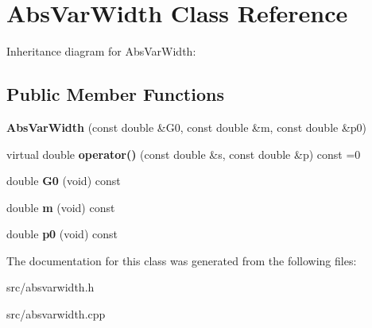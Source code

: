 \hypertarget{class_abs_var_width}{}\section{Abs\+Var\+Width Class Reference}
\label{class_abs_var_width}


Inheritance diagram for Abs\+Var\+Width\+:
\subsection*{Public Member Functions}
\begin{DoxyCompactItemize}
\item 
\hypertarget{class_abs_var_width_ae49f00a70fe7362946f3941645f00294}{}{\bfseries Abs\+Var\+Width} (const double \&G0, const double \&m, const double \&p0)\label{class_abs_var_width_ae49f00a70fe7362946f3941645f00294}

\item 
\hypertarget{class_abs_var_width_a92ac8aacb759b534f5900a0acdc3c0d0}{}virtual double {\bfseries operator()} (const double \&s, const double \&p) const =0\label{class_abs_var_width_a92ac8aacb759b534f5900a0acdc3c0d0}

\item 
\hypertarget{class_abs_var_width_a22569299c6d3b374c89e6eba0ceee320}{}double {\bfseries G0} (void) const \label{class_abs_var_width_a22569299c6d3b374c89e6eba0ceee320}

\item 
\hypertarget{class_abs_var_width_a6003ac4e38642f08e5b3928ba0ad2a01}{}double {\bfseries m} (void) const \label{class_abs_var_width_a6003ac4e38642f08e5b3928ba0ad2a01}

\item 
\hypertarget{class_abs_var_width_a87a7089ed207981487b04b5267283f62}{}double {\bfseries p0} (void) const \label{class_abs_var_width_a87a7089ed207981487b04b5267283f62}

\end{DoxyCompactItemize}


The documentation for this class was generated from the following files\+:\begin{DoxyCompactItemize}
\item 
src/absvarwidth.\+h\item 
src/absvarwidth.\+cpp\end{DoxyCompactItemize}
